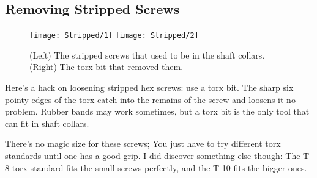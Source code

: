 \subsection{Removing Stripped Screws}

\begin{figure}[h]
    \centering
    \texttt{[image: Stripped/1]}
    \texttt{[image: Stripped/2]}
    \caption{
        (Left) The stripped screws that used to be in the shaft collars. (Right) The torx bit that removed them.
    }
\end{figure}

Here's a hack on loosening stripped hex screws: use a torx bit. The sharp six pointy edges of the torx catch into the remains of the screw and loosens it no problem. Rubber bands may work sometimes, but a torx bit is the only tool that can fit in shaft collars. 

There's no magic size for these screws; You just have to try different torx standards until one has a good grip. I did discover something else though: The T-8 torx standard fits the small screws perfectly, and the T-10 fits the bigger ones.

